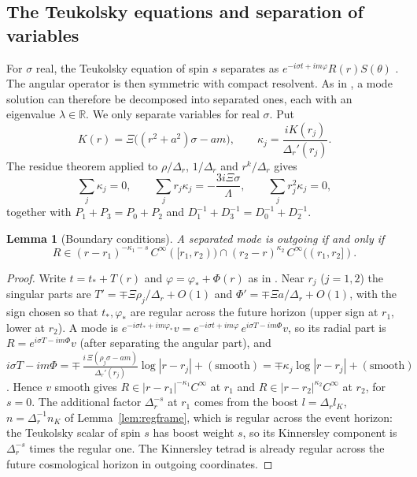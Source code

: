 \documentclass[11pt]{amsart}
\newtheorem{lemma}[theorem]{Lemma}
\theoremstyle{definition}
\theoremstyle{remark}
\numberwithin{equation}{section}
\newcommand{\R}{\mathbb{R}}
\begin{document}
\subsection{The Teukolsky equations and separation of variables}
For $\sigma$ real, the Teukolsky equation of spin $s$ separates as $e^{-i\sigma t+im\varphi}R(r)S(\theta)$
\cite{Kha83}. The angular operator is then symmetric with compact resolvent. As in \cite[\S3]{Hin26}, a mode solution
can therefore be decomposed into separated ones, each with an eigenvalue $\lambda\in\R$. We only separate variables
for real $\sigma$. Put
\[
K(r)=\Xi\big((r^2+a^2)\sigma-am\big),\qquad \kappa_j=\frac{iK(r_j)}{\Delta_r'(r_j)}.
\]
The residue theorem applied to $\rho/\Delta_r$, $1/\Delta_r$ and $r^k/\Delta_r$ gives
\begin{equation}\label{eq:residues}
\sum_j\kappa_j=0,\qquad\sum_jr_j\kappa_j=-\frac{3i\Xi\sigma}{\Lambda},\qquad\sum_jr_j^2\kappa_j=0,
\end{equation}
together with $P_1+P_3=P_0+P_2$ and $D_1^{-1}+D_3^{-1}=D_0^{-1}+D_2^{-1}$.

\begin{lemma}[Boundary conditions]\label{lem:bc}
A separated mode is outgoing if and only if
\[
R\in(r-r_1)^{-\kappa_1-s}\,C^\infty([r_1,r_2))\cap(r_2-r)^{\kappa_2}\,C^\infty((r_1,r_2]).
\]
\end{lemma}
\begin{proof}
Write $t=t_*+T(r)$ and $\varphi=\varphi_*+\Phi(r)$ as in \cite[(3.4)]{Hin26}. Near $r_j$ ($j=1,2$) the singular parts are
$T'=\mp\Xi\rho_j/\Delta_r+O(1)$ and $\Phi'=\mp\Xi a/\Delta_r+O(1)$, with the sign chosen so that $t_*,\varphi_*$ are regular
across the future horizon (upper sign at $r_1$, lower at $r_2$). A mode is
$e^{-i\sigma t_*+im\varphi_*}v=e^{-i\sigma t+im\varphi}\,e^{i\sigma T-im\Phi}v$, so its radial part is
$R=e^{i\sigma T-im\Phi}v$ (after separating the angular part), and
$i\sigma T-im\Phi=\mp\,\frac{i\,\Xi(\rho_j\sigma-am)}{\Delta_r'(r_j)}\log|r-r_j|+(\text{smooth})=\mp\kappa_j\log|r-r_j|+(\text{smooth})$.
Hence $v$ smooth gives $R\in|r-r_1|^{-\kappa_1}C^\infty$ at $r_1$ and $R\in|r-r_2|^{\kappa_2}C^\infty$ at $r_2$, for $s=0$. The additional factor $\Delta_r^{-s}$ at $r_1$ comes from the boost
$l=\Delta_rl_K$, $n=\Delta_r^{-1}n_K$ of Lemma~\ref{lem:regframe}, which is regular across the event horizon: the Teukolsky
scalar of spin $s$ has boost weight $s$, so its Kinnersley component is $\Delta_r^{-s}$ times the regular one. The Kinnersley tetrad is
already regular across the future cosmological horizon in outgoing coordinates.
\end{proof}
\end{document}
